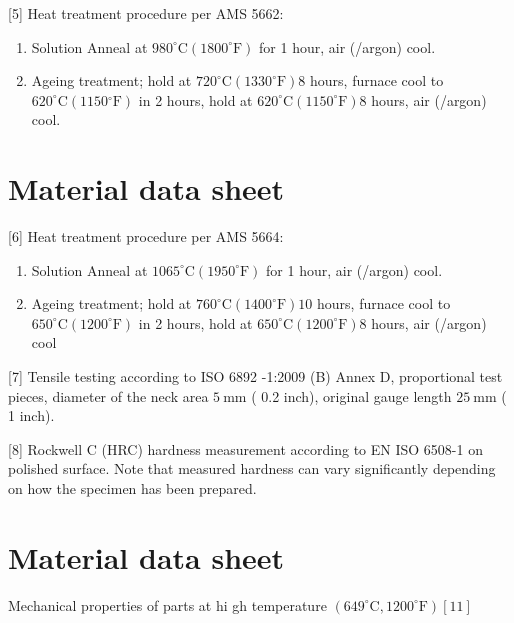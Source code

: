 \documentclass[10pt]{article}
\begin{document}
[5] Heat treatment procedure per AMS 5662:

\begin{enumerate}
  \item Solution Anneal at $980^{\circ} \mathrm{C}\left(1800^{\circ} \mathrm{F}\right)$ for 1 hour, air (/argon) cool.

  \item Ageing treatment; hold at $720^{\circ} \mathrm{C}\left(1330^{\circ} \mathrm{F}\right) 8$ hours, furnace cool to $620^{\circ} \mathrm{C}\left(1150{ }^{\circ} \mathrm{F}\right)$ in 2 hours, hold at $620^{\circ} \mathrm{C}\left(1150^{\circ} \mathrm{F}\right) 8$ hours, air (/argon) cool.

\end{enumerate}

\section*{Material data sheet}
[6] Heat treatment procedure per AMS 5664:

\begin{enumerate}
  \item Solution Anneal at $1065^{\circ} \mathrm{C}\left(1950^{\circ} \mathrm{F}\right)$ for 1 hour, air (/argon) cool.

  \item Ageing treatment; hold at $760^{\circ} \mathrm{C}\left(1400^{\circ} \mathrm{F}\right) 10$ hours, furnace cool to $650^{\circ} \mathrm{C}\left(1200^{\circ} \mathrm{F}\right)$ in 2 hours, hold at $650^{\circ} \mathrm{C}\left(1200^{\circ} \mathrm{F}\right) 8$ hours, air (/argon) cool

\end{enumerate}

[7] Tensile testing according to ISO 6892 -1:2009 (B) Annex D, proportional test pieces, diameter of the neck area $5 \mathrm{~mm}$ ( 0.2 inch), original gauge length $25 \mathrm{~mm}$ ( 1 inch).

[8] Rockwell C (HRC) hardness measurement according to EN ISO 6508-1 on polished surface. Note that measured hardness can vary significantly depending on how the specimen has been prepared.

\section*{Material data sheet}
Mechanical properties of parts at hi gh temperature $\left(649^{\circ} \mathrm{C}, 1200^{\circ} \mathrm{F}\right)[11]$
\end{document}
